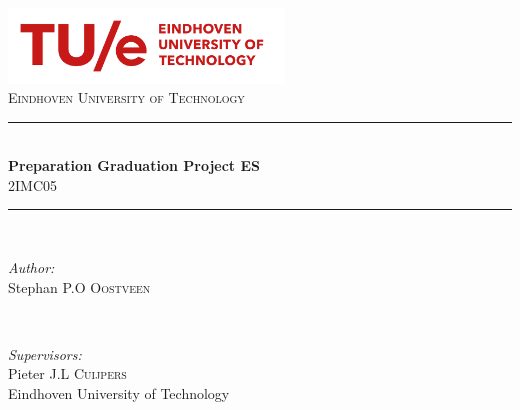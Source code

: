 \begin{titlepage}

\newcommand{\HRule}{\rule{\linewidth}{0.5mm}} %

\center %
 
\includegraphics[width=0.55\textwidth]{images/tuelogonew.png}\\[0.7cm]
\textsc{\LARGE Eindhoven University of Technology}\\[2.5cm] %


\HRule \\[0.4cm]
{ \huge \bfseries Preparation Graduation Project ES}\\[0.4cm] %
2IMC05
\HRule \\[2cm]
 

\begin{minipage}[t]{0.5\textwidth}
\begin{flushleft} \large
\emph{Author:}\\
Stephan P.O \textsc{Oostveen}\\
\end{flushleft}
\end{minipage}
~
\begin{minipage}[t]{0.45\textwidth}
\begin{flushright} \large
\emph{Supervisors:} \\ 
Pieter J.L \textsc{Cuijpers}\\  %
Eindhoven University of Technology \\[1em]


\end{flushright}
\end{minipage}
\end{titlepage}
